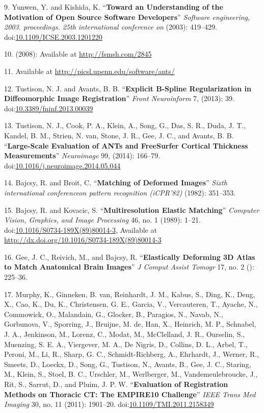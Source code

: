 \documentclass[11pt,]{article}
\begin{document}
\hypertarget{ref-Yunwen:2003aa}{}
9. Yunwen, Y. and Kishida, K. ``\textbf{Toward an Understanding of the
Motivation of Open Source Software Developers}'' \emph{Software
engineering, 2003. proceedings. 25th international conference on}
(2003): 419--429.
doi:\href{https://doi.org/10.1109/ICSE.2003.1201220}{10.1109/ICSE.2003.1201220}

\hypertarget{ref-Rothwell:2008aa}{}
10. (2008): Available at \url{http://fsmsh.com/2845}

\hypertarget{ref-ANTsWebsite}{}
11. Available at \url{http://picsl.upenn.edu/software/ants/}

\hypertarget{ref-Tustison:2013ac}{}
12. Tustison, N. J. and Avants, B. B. ``\textbf{Explicit B-Spline
Regularization in Diffeomorphic Image Registration}'' \emph{Front
Neuroinform} 7, (2013): 39.
doi:\href{https://doi.org/10.3389/fninf.2013.00039}{10.3389/fninf.2013.00039}

\hypertarget{ref-Tustison:2014ab}{}
13. Tustison, N. J., Cook, P. A., Klein, A., Song, G., Das, S. R., Duda,
J. T., Kandel, B. M., Strien, N. van, Stone, J. R., Gee, J. C., and
Avants, B. B. ``\textbf{Large-Scale Evaluation of ANTs and FreeSurfer
Cortical Thickness Measurements}'' \emph{Neuroimage} 99, (2014):
166--79.
doi:\href{https://doi.org/10.1016/j.neuroimage.2014.05.044}{10.1016/j.neuroimage.2014.05.044}

\hypertarget{ref-Bajcsy:1982aa}{}
14. Bajcsy, R. and Broit, C. ``\textbf{Matching of Deformed Images}''
\emph{Sixth international conferenceon pattern recognition (iCPR'82)}
(1982): 351--353.

\hypertarget{ref-Bajcsy:1989aa}{}
15. Bajcsy, R. and Kovacic, S. ``\textbf{Multiresolution Elastic
Matching}'' \emph{Computer Vision, Graphics, and Image Processing} 46,
no. 1 (1989): 1--21.
doi:\href{https://doi.org/10.1016/S0734-189X(89)80014-3}{10.1016/S0734-189X(89)80014-3},
Available at \url{http://dx.doi.org/10.1016/S0734-189X(89)80014-3}

\hypertarget{ref-Gee:1993aa}{}
16. Gee, J. C., Reivich, M., and Bajcsy, R. ``\textbf{Elastically
Deforming 3D Atlas to Match Anatomical Brain Images}'' \emph{J Comput
Assist Tomogr} 17, no. 2 (): 225--36.

\hypertarget{ref-Murphy:2011aa}{}
17. Murphy, K., Ginneken, B. van, Reinhardt, J. M., Kabus, S., Ding, K.,
Deng, X., Cao, K., Du, K., Christensen, G. E., Garcia, V., Vercauteren,
T., Ayache, N., Commowick, O., Malandain, G., Glocker, B., Paragios, N.,
Navab, N., Gorbunova, V., Sporring, J., Bruijne, M. de, Han, X.,
Heinrich, M. P., Schnabel, J. A., Jenkinson, M., Lorenz, C., Modat, M.,
McClelland, J. R., Ourselin, S., Muenzing, S. E. A., Viergever, M. A.,
De Nigris, D., Collins, D. L., Arbel, T., Peroni, M., Li, R., Sharp, G.
C., Schmidt-Richberg, A., Ehrhardt, J., Werner, R., Smeets, D., Loeckx,
D., Song, G., Tustison, N., Avants, B., Gee, J. C., Staring, M., Klein,
S., Stoel, B. C., Urschler, M., Werlberger, M., Vandemeulebroucke, J.,
Rit, S., Sarrut, D., and Pluim, J. P. W. ``\textbf{Evaluation of
Registration Methods on Thoracic CT: The EMPIRE10 Challenge}''
\emph{IEEE Trans Med Imaging} 30, no. 11 (2011): 1901--20.
doi:\href{https://doi.org/10.1109/TMI.2011.2158349}{10.1109/TMI.2011.2158349}
\end{document}
